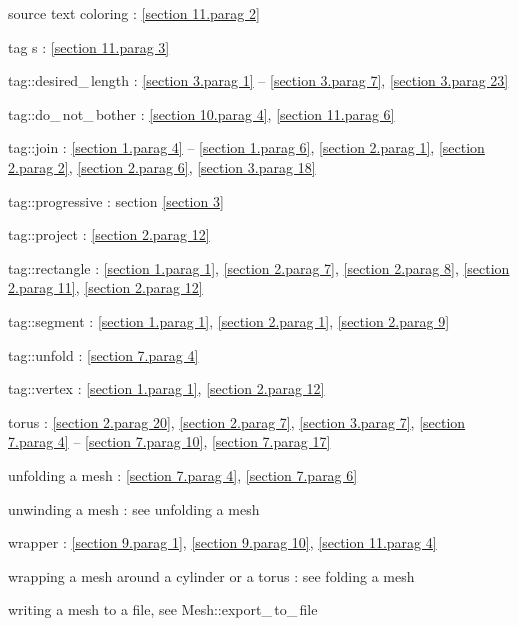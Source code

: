 \documentclass[a4paper]{scrreprt}
\def\numb{}
\newcommand\verm[1]{\textcolor{manif}{#1}}
\renewcommand\tt{\normalfont\ttfamily}
\begin{document}
\noindent
source text coloring : \ref{\numb section 11.\numb parag 2}

\noindent
{\small\tt\textcolor{tag}{tag}}\hskip0.5pt s : \ref{\numb section 11.\numb parag 3}
  
\noindent
{\small\tt\textcolor{tag}{tag}::desired\_\,length} :
\ref{\numb section 3.\numb parag 1} -- \ref{\numb section 3.\numb parag 7},
\ref{\numb section 3.\numb parag 23}

\noindent
{\small\tt\textcolor{tag}{tag}::do\_\,not\_\,bother} :
\ref{\numb section 10.\numb parag 4}, \ref{\numb section 11.\numb parag 6}

\noindent
{\small\tt\textcolor{tag}{tag}::join} :
\ref{\numb section 1.\numb parag 4} -- \ref{\numb section 1.\numb parag 6},
\ref{\numb section 2.\numb parag 1}, \ref{\numb section 2.\numb parag 2},
\ref{\numb section 2.\numb parag 6}, \ref{\numb section 3.\numb parag 18}

\noindent
{\small\tt\textcolor{tag}{tag}::progressive} : section \ref{\numb section 3}
  
\noindent
{\small\tt\textcolor{tag}{tag}::project} : \ref{\numb section 2.\numb parag 12}
  
\noindent
{\small\tt\textcolor{tag}{tag}::rectangle} : \ref{\numb section 1.\numb parag 1},
\ref{\numb section 2.\numb parag 7}, \ref{\numb section 2.\numb parag 8},
\ref{\numb section 2.\numb parag 11}, \ref{\numb section 2.\numb parag 12}

\noindent
{\small\tt\textcolor{tag}{tag}::segment} : \ref{\numb section 1.\numb parag 1}, 
\ref{\numb section 2.\numb parag 1}, \ref{\numb section 2.\numb parag 9}

\noindent
{\small\tt\textcolor{tag}{tag}::unfold} : \ref{\numb section 7.\numb parag 4}

\noindent
{\small\tt\textcolor{tag}{tag}::vertex} : \ref{\numb section 1.\numb parag 1},
\ref{\numb section 2.\numb parag 12}
  
\noindent
torus : \ref{\numb section 2.\numb parag 20}, \ref{\numb section 2.\numb parag 7},
\ref{\numb section 3.\numb parag 7},
\ref{\numb section 7.\numb parag 4} -- \ref{\numb section 7.\numb parag 10},
\ref{\numb section 7.\numb parag 17}

\noindent
unfolding a mesh : \ref{\numb section 7.\numb parag 4}, \ref{\numb section 7.\numb parag 6}

\noindent
unwinding a mesh : see unfolding a mesh

\noindent
wrapper : \ref{\numb section 9.\numb parag 1}, \ref{\numb section 9.\numb parag 10},
\ref{\numb section 11.\numb parag 4}

\noindent
wrapping a mesh around a cylinder or a torus : see folding a mesh

\noindent
writing a mesh to a file, see {\small\tt\verm{Mesh}::export\_\,to\_\,file}
\end{document}
